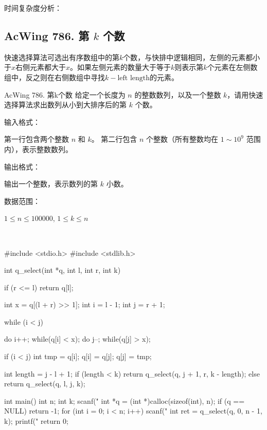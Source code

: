 时间复杂度分析：

\subsection{AcWing 786. 第 $k$ 个数}
快速选择算法可选出有序数组中的第$k$个数，与快排中逻辑相同，左侧的元素都小于$x$右侧元素都大于$x$。如果左侧元素的数量大于等于$k$则表示第$k$个元素在左侧数组中，反之则在右侧数组中寻找$k-\text{left length}$的元素。

\begin{titledbox}{AcWing 786. 第k个数}
    给定一个长度为 $n$ 的整数数列，以及一个整数 $k$，请用快速选择算法求出数列从小到大排序后的第 $k$ 个数。

    输入格式：

    第一行包含两个整数 $n$ 和 $k$。
    第二行包含 $n$ 个整数（所有整数均在 $1 \sim 10^9$ 范围内），表示整数数列。

    输出格式：

    输出一个整数，表示数列的第 $k$ 小数。

    数据范围：

    $1 \le n \le 100000$,
    $1 \le k \le n$

    \begin{inputblock}
         \\
    \end{inputblock}
    \begin{outputblock}
    \end{outputblock}
\end{titledbox}


\begin{mycpptwocol}
    #include <stdio.h>
    #include <stdlib.h>

    int q_select(int *q, int l, int r, int k) {
        if (r <= l) {
            return q[l];
        }

        int x = q[(l + r) >> 1];
        int i = l - 1;
        int j = r + 1;

        while (i < j) {
            do i++; while(q[i] < x);
            do j--; while(q[j] > x);

            if (i < j) {
                int tmp = q[i];
                q[i] = q[j];
                q[j] = tmp;
            }
        }

        int length = j - l + 1;
        if (length < k) {
            return q_select(q, j + 1, r,
            k - length);
        } else {
            return q_select(q, l, j, k);
        }
    }

    int main() {
        int n;
        int k;
        scanf("%
        int *q = (int *)calloc(sizeof(int), n);
        if (q == NULL) {
            return -1;
        }
        for (int i = 0; i < n; i++) {
            scanf("%
        }
        int ret = q_select(q, 0, n - 1, k);
        printf("%
        return 0;
    }
\end{mycpptwocol}


